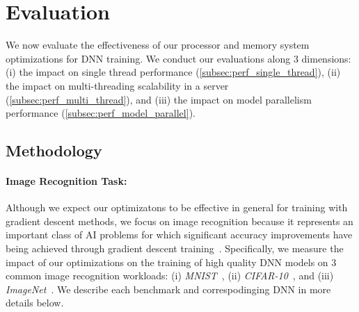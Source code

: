 \section{Evaluation}
\label{sec:eval}
We now evaluate the effectiveness of our processor and memory system optimizations for DNN training.  We conduct our evaluations along $3$ dimensions: (i) the impact on single thread performance (\ref{subsec:perf_single_thread}), (ii) the impact on multi-threading scalability in a server (\ref{subsec:perf_multi_thread}), and (iii)  the impact on model parallelism performance (\ref{subsec:perf_model_parallel}).  

 \subsection{Methodology}
 \label{subsec:eval_method}
 
\paragraph{Image Recognition Task:}
Although we expect our optimizatons to be effective in general for training with gradient descent methods, we focus on image recognition because it represents an important class of AI problems for which significant accuracy improvements have being achieved through gradient descent training~\cite{Krizhevsky12, Le12, Dean12, Chilimbi14, He15}. Specifically, we measure the impact of our optimizations on the training of high quality DNN models on $3$ common image recognition workloads: (i) {\it MNIST}~\cite{Lecun98}, (ii) {\it CIFAR-10}~\cite{KrizhevskyThesis}, and (iii) {\it ImageNet}~\cite{imagenet09}. We describe each benchmark and correspodinging DNN in more details below. 
 
